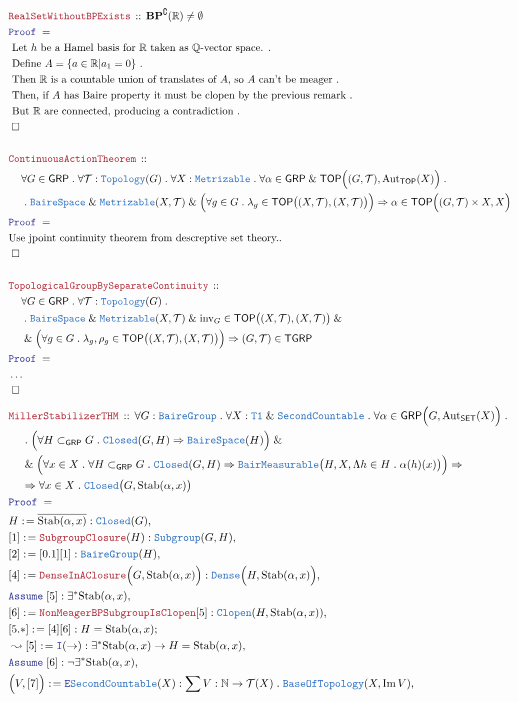 \documentclass[12pt]{scrartcl}
\newcommand{\TYPE}[1]{\textcolor{NavyBlue}{\mathtt{#1}}}
\newcommand{\LOGIC}[1]{\textcolor{Blue}{\mathtt{#1}}}
\newcommand{\THM}[1]{\textcolor{Maroon}{\mathtt{#1}}}
\renewcommand{\.}{\; . \;}
\newcommand{\de}{: \kern 0.1pc =}
\newcommand{\Theorem}[2]{& \THM{#1} \, :: \, #2 \\ & \Proof = \\ }
\newcommand{\NewLine}{\\ & \kern 1pc}
\newcommand{\Page}[1]{ \begin{align*} #1 \end{align*}   }
\newcommand{\NoProof}{ & \ldots \\ \EndProof}
\renewcommand{\And}{\; \& \;}
\newcommand{\Imply}{\Rightarrow}
\newcommand{\Reals}{\mathbb{R} }
\newcommand{\Rats}{\mathbb{Q} }
\newcommand{\Nat}{\mathbb{N} }
\DeclareMathOperator*{\im}{Im}
\newcommand{\Aut}{\mathrm{Aut}}
\renewcommand{\c}{\complement}
\newcommand{\Say}[3]{& #1 \de #2 : #3, \\}
\newcommand{\Conclude}[3]{& #1 \de #2 : #3; \\}
\newcommand{\Derive}[3]{& \leadsto #1 \de #2 : #3, \\}
\newcommand{\Assume}[2]{& \LOGIC{Assume} \; #1 : #2, \\}
\newcommand{\Explain}[1]{& \text{#1.} \\}
\newcommand{\Intro}{\LOGIC{I}}
\newcommand{\Elim}{\LOGIC{E}}
\newcommand{\QED}{\; \square}
\newcommand{\EndProof}{& \QED \\}
\newcommand{\Proof}{\LOGIC{Proof} \; }
\newcommand{\SET}{\mathsf{SET}}
\newcommand{\Dense}{\TYPE{Dense}}
\newcommand{\Closed}{\TYPE{Closed}}
\newcommand{\Clopen}{\TYPE{Clopen}}
\newcommand{\Bair}{\TYPE{BaireSpace}}
\newcommand{\TOP}{\mathsf{TOP}}
\newcommand{\T}{\mathcal{T}}
\newcommand{\BP}{\mathbf{BP}}
\newcommand{\BM}{\TYPE{BairMeasurable}}
\newcommand{\Sgrp}{\subset_{\mathsf{GRP}}}
\newcommand{\Stab}{\mathrm{Stab}}
\newcommand{\GRP}{\mathsf{GRP}}
\newcommand{\BG}{\TYPE{BaireGroup}}
\newcommand{\inv}{\mathrm{inv}}
\newcommand{\TGRP}{\mathsf{TGRP}}
\begin{document}
\Page{
	\Theorem{RealSetWithoutBPExists}{
		 \BP^\c(\Reals) \neq \emptyset
	}
	\Explain{
		Let $h$ be a Hamel basis for $\Reals$ taken as $\Rats$-vector space.
	}
	\Explain{
		Define $A=\{ a \in \Reals | a_1 = 0 \}$
	}
	\Explain{
		Then $\Reals$ is a countable union of translates of $A$,
		so $A$ can't be meager
	}
	\Explain{
		Then, if $A$ has Baire property it must be clopen by the previous remark
	}
	\Explain{
		But $\Reals$ are connected, producing a contradiction
	}
	\EndProof
	\\
	\Theorem{ContinuousActionTheorem}
	{
		\NewLine 		
		\forall G \in \GRP \.
		\forall \T : \TYPE{Topology}(G) \.
		\forall X : \TYPE{Metrizable} \.
		\forall \alpha \in \GRP \And \TOP\Big( (G,\T), \Aut_\TOP(X) \Big) \. 
		\NewLine \.
		\Bair \And \TYPE{Metrizable}(X,\T) \And 
		\Big( 
			\forall g \in G \. 
			\lambda_g \in \TOP\big( (X,\T), (X,\T)\big) 
		\Big)
		\Imply
		\alpha \in \TOP\Big( (G,\T)\times X, X \Big) 
	}
	\Explain{Use jpoint continuity theorem from descreptive set theory.}
	\EndProof
	\\
	\Theorem{TopologicalGroupBySeparateContinuity}
	{
		\NewLine 		
		\forall G \in \GRP \.
		\forall \T : \TYPE{Topology}(G) \.
		\NewLine \.
		\Bair \And \TYPE{Metrizable}(X,\T) \And
		\inv_G \in   \TOP\big( (X,\T), (X,\T)\big) \And \NewLine \And
		\Big( 
			\forall g \in G \. 
			\lambda_g,\rho_g \in \TOP\big( (X,\T), (X,\T)\big) 
		\Big)
		\Imply
		(G,\T) \in \TGRP
	}
	\NoProof
}\Page{
	\Theorem{MillerStabilizerTHM}
	{
		\forall G : \BG \.
		\forall X : \TYPE{T1} \And \TYPE{SecondCountable} \.
		\forall \alpha \in \GRP\Big( G, \Aut_\SET(X) \Big) \. \NewLine \.
		\Big( \forall H \Sgrp G \. \Closed(G,H) \Imply \Bair(H) \Big)
		\And \NewLine \And
		\Big( \forall x \in X \. \forall H \Sgrp G \.
		\Closed(G,H)  \Imply   \BM\big(H,X,\Lambda h \in H \. \alpha(h)(x)\big) \Big)
		\Imply \NewLine \Imply
		\forall x \in X \. \Closed\big(G, \Stab(\alpha,x) \big)
	}
	\Say{H}{\overline{\Stab(\alpha,x)}}{\Closed(G)}
	\Say{[1]}{\THM{SubgroupClosure}(H)}{\TYPE{Subgroup}(G,H)}
	\Say{[2]}{[0.1][1]}{\BG(H)}
	\Say{[4]}{\THM{DenseInAClosure}\Big(G,\Stab(\alpha,x)\Big)}
	{
		\Dense\Big(H,\Stab(\alpha,x)\Big)
	}
	\Assume{[5]}{\exists^* \Stab(\alpha,x)}
	\Say{[6]}{\THM{NonMeagerBPSubgroupIsClopen}[5]}
	{
		\Clopen(H,\Stab(\alpha,x))
	}
	\Conclude{[5.*]}{[4][6]}{H = \Stab(\alpha,x)}
	\Derive{[5]}{\Intro(\to)}
	{		
		\exists^*\Stab(\alpha,x) \to H = \Stab(\alpha,x)	
	}
	\Assume{[6]}{\neg \exists^* \Stab(\alpha,x)}
	\Say{\Big(V,[7]\Big)}{\Elim \TYPE{SecondCountable}(X)}
	{
		\sum V: \Nat \to \T(X) \.  \TYPE{BaseOfTopology}(X,\im V) 
}}
\end{document}
